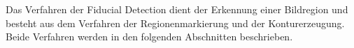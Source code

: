 Das Verfahren der Fiducial Detection dient der Erkennung einer Bildregion und besteht aus dem Verfahren der
 Regionenmarkierung und der Konturerzeugung. Beide Verfahren werden in den folgenden Abschnitten beschrieben.




